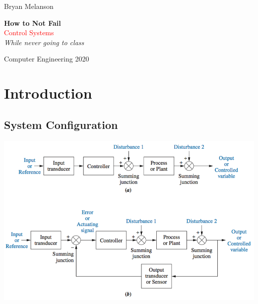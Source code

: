 \documentclass[11pt]{article}
\newcommand*{\plogo}{\fbox{$\mathcal{BM}$}}
\begin{document}
 
        
    \begin{titlepage}
    
        \raggedleft
        
        \vspace*{\baselineskip}
        
        {\Large Bryan Melanson}
        
        \vspace*{0.167\textheight}
        
        \textbf{\LARGE How to Not Fail}\\[\baselineskip]
        
        {\textcolor{Red}{\Huge Control Systems}}\\[\baselineskip]
        
        {\Large \textit{While never going to class}}
        
        \vfill
        
        {\large Computer Engineering 2020 ~~\plogo}
        
        \vspace*{3\baselineskip}
    
    \end{titlepage}

    \pagebreak


    \tableofcontents

    \pagebreak



    \section{Introduction}

    \subsection{System Configuration}

    \begin{center}
        \includegraphics[width=300 px]{img/system-blocks}
    \end{center}
\end{document}
